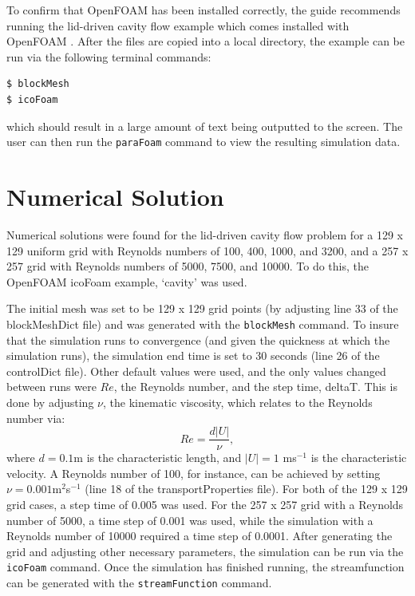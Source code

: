 \documentclass[twocolumn,10pt]{asme2ej}
\begin{document}
To confirm that OpenFOAM has been installed correctly, the guide recommends running the lid-driven cavity flow example which comes installed with OpenFOAM \cite{ctfm_1}. After the files are copied into a local directory, the example can be run via the following terminal commands:
\begin{lstlisting}[language=sh]
$ blockMesh
$ icoFoam
\end{lstlisting}
which should result in a large amount of text being outputted to the screen. The user can then run the \lstinline[language=sh]`paraFoam` command to view the resulting simulation data.

\section{Numerical Solution}

Numerical solutions were found for the lid-driven cavity flow problem for a 129 x 129 uniform grid with Reynolds numbers of 100, 400, 1000, and 3200, and a 257 x 257 grid with Reynolds numbers of 5000, 7500, and 10000. To do this, the OpenFOAM icoFoam example, `cavity' was used.

The initial mesh was set to be 129 x 129 grid points (by adjusting line 33 of the blockMeshDict file) and was generated with the \lstinline[language=sh]`blockMesh` command. To insure that the simulation runs to convergence (and given the quickness at which the simulation runs), the simulation end time is set to 30 seconds (line 26 of the controlDict file). Other default values were used, and the only values changed between runs were $Re$, the Reynolds number, and the step time, deltaT. This is done by adjusting $\nu$, the kinematic viscosity, which relates to the Reynolds number via:
\begin{equation}
Re = \frac{d|U|}{\nu},
\end{equation}
where $d = 0.1$m is the characteristic length, and $|U| = 1$ ms$^{-1}$ is the characteristic velocity. A Reynolds number of 100, for instance, can be achieved by setting $\nu = 0.001$m$^2$s$^{-1}$ (line 18 of the transportProperties file). For both of the 129 x 129 grid cases, a step time of 0.005 was used. For the 257 x 257 grid with a Reynolds number of 5000, a time step of 0.001 was used, while the simulation with a Reynolds number of 10000 required a time step of 0.0001. After generating the grid and adjusting other necessary parameters, the simulation can be run via the \lstinline[language=sh]`icoFoam` command. Once the simulation has finished running, the streamfunction can be generated with the \lstinline[language=sh]`streamFunction` command.
\end{document}
